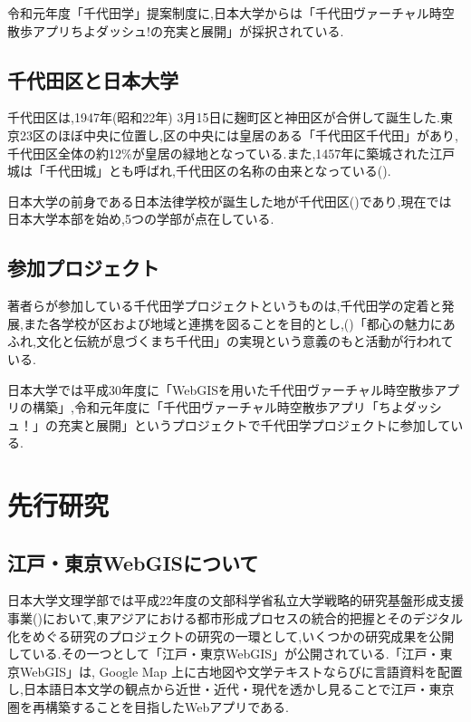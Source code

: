 \documentclass[a4paper, twoside]{jarticle}
\begin{document}
\begin{multicols}{2}
令和元年度「千代田学」提案制度に,日本大学からは「千代田ヴァーチャル時空散歩アプリちよダッシュ!の充実と展開」が採択されている.

\subsection{千代田区と日本大学}
千代田区は,1947年(昭和22年) 3月15日に麹町区と神田区が合併して誕生した.東京23区のほぼ中央に位置し,区の中央には皇居のある「千代田区千代田」があり,千代田区全体の約12\%が皇居の緑地となっている.また,1457年に築城された江戸城は「千代田城」とも呼ばれ,千代田区の名称の由来となっている(\cite{digi1}).\par
日本大学の前身である日本法律学校が誕生した地が千代田区(\cite{digi2})であり,現在では日本大学本部を始め,5つの学部が点在している.

\subsection{参加プロジェクト}
著者らが参加している千代田学プロジェクトというものは,千代田学の定着と発展,また各学校が区および地域と連携を図ることを目的とし,(\cite{chiyopro})「都心の魅力にあふれ,文化と伝統が息づくまち千代田」の実現という意義のもと活動が行われている.\par
日本大学では平成30年度に「WebGISを用いた千代田ヴァーチャル時空散歩アプリの構築」,令和元年度に「千代田ヴァーチャル時空散歩アプリ「ちよダッシュ！」の充実と展開」というプロジェクトで千代田学プロジェクトに参加している.


\section{先行研究}


\subsection{江戸・東京WebGISについて}
日本大学文理学部では平成22年度の文部科学省私立大学戦略的研究基盤形成支援事業(\cite{monka})において,東アジアにおける都市形成プロセスの統合的把握とそのデジタル化をめぐる研究のプロジェクトの研究の一環として,いくつかの研究成果を公開している.その一つとして「江戸・東京WebGIS」が公開されている.「江戸・東京WebGIS」は, Google Map 上に古地図や文学テキストならびに言語資料を配置し,日本語日本文学の観点から近世・近代・現代を透かし見ることで江戸・東京圏を再構築することを目指したWebアプリである.


\end{multicols}
\end{document}
